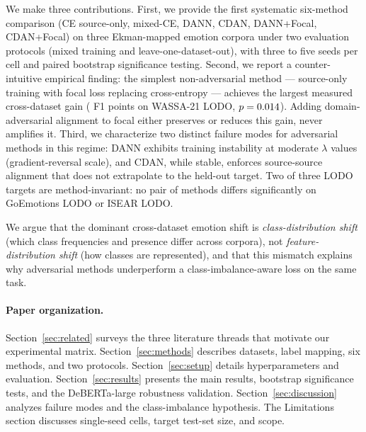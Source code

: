 We make three contributions. First, we provide the first systematic
six-method comparison (CE source-only, mixed-CE, DANN, CDAN, DANN+Focal,
CDAN+Focal) on three Ekman-mapped emotion corpora under two
evaluation protocols (mixed training and leave-one-dataset-out),
with three to five seeds per cell and paired bootstrap significance
testing.
Second, we report a counter-intuitive empirical finding: the simplest
non-adversarial method — source-only training with focal loss
replacing cross-entropy — achieves the largest measured cross-dataset
gain (\focalwassagain{} F1 points on WASSA-21 LODO,
$p=0.014$). Adding domain-adversarial alignment to focal
either preserves or reduces this gain, never amplifies it.
Third, we characterize two distinct failure modes for adversarial
methods in this regime: DANN exhibits training instability at moderate
$\lambda$ values (gradient-reversal scale), and CDAN, while stable,
enforces source-source alignment that does not extrapolate to the
held-out target. Two of three LODO targets are
method-invariant: no pair of methods differs significantly on
GoEmotions LODO or ISEAR LODO.

We argue that the dominant cross-dataset emotion shift is
\emph{class-distribution shift} (which class frequencies and presence
differ across corpora), not \emph{feature-distribution shift} (how
classes are represented), and that this mismatch explains why
adversarial methods underperform a class-imbalance-aware loss on the
same task.

\paragraph{Paper organization.}
Section~\ref{sec:related} surveys the three literature threads that
motivate our experimental matrix. Section~\ref{sec:methods}
describes datasets, label mapping, six methods, and two protocols.
Section~\ref{sec:setup} details hyperparameters and evaluation.
Section~\ref{sec:results} presents the main results, bootstrap
significance tests, and the DeBERTa-large robustness validation.
Section~\ref{sec:discussion} analyzes failure modes and the
class-imbalance hypothesis. The Limitations section discusses
single-seed cells, target test-set size, and scope.
